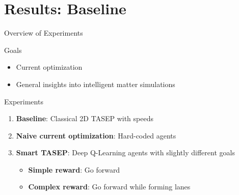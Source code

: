 \documentclass[10pt,xcolor=table, aspectratio=1610]{beamer}
\begin{document}
\section[Baseline]{Results: Baseline}
\begin{frame}{Overview of Experiments}
  \begin{block}{Goals}
    \begin{itemize}
      \item Current optimization
      \item General insights into intelligent matter simulations  
    \end{itemize}
  \end{block}
  \begin{block}{Experiments}
  \begin{enumerate}
    \item \textbf{Baseline}: Classical 2D TASEP with speeds
    \item \textbf{Naive current optimization}: Hard-coded agents
    \item \textbf{Smart TASEP}: Deep Q-Learning agents with slightly different goals
    \begin{itemize}
      \item \textbf{Simple reward}: Go forward
      \item \textbf{Complex reward}: Go forward while forming lanes
    \end{itemize}
  \end{enumerate}
  \end{block}
\end{frame}
\end{document}

